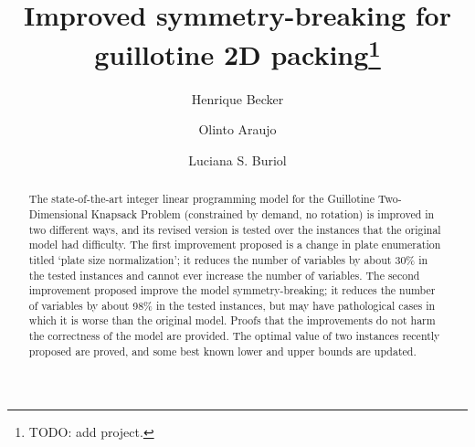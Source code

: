 \documentclass[runningheads]{llncs}
\begin{document}
\title{Improved symmetry-breaking for guillotine 2D packing\thanks{TODO: add project.}}


\author{Henrique Becker \and
Olinto Araujo \and
Luciana S. Buriol}



\maketitle

\begin{abstract}

The state-of-the-art integer linear programming model for the Guillotine Two-Dimensional Knapsack Problem (constrained by demand, no rotation) is improved in two different ways, and its revised version is tested over the instances that the original model had difficulty.
The first improvement proposed is a change in plate enumeration titled `plate size normalization'; it reduces the number of variables by about 30\% in the tested instances and cannot ever increase the number of variables. 
The second improvement proposed improve the model symmetry-breaking; it reduces the number of variables by about 98\% in the tested instances, but may have pathological cases in which it is worse than the original model.
Proofs that the improvements do not harm the correctness of the model are provided.
The optimal value of two instances recently proposed are proved, and some best known lower and upper bounds are updated.

\end{abstract}
\end{document}
